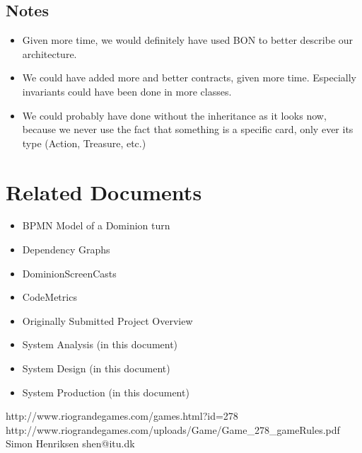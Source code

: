 \documentclass[12pt,a4paper,notitlepage]{article}
\begin{document}
\subsection{Notes}
\begin{itemize}
\item Given more time, we would definitely have used BON to better describe our architecture.
\item We could have added more and better contracts, given more time. Especially invariants could have been done in more classes.
\item We could probably have done without the inheritance as it looks now, because we never use the fact that something is a specific card, only ever its type (Action, Treasure, etc.)
\end{itemize}
\pagebreak

\pagebreak

\pagebreak

\section{Related Documents}
\begin{itemize}
\item BPMN Model of a Dominion turn
\item Dependency Graphs
\item DominionScreenCasts
\item CodeMetrics
\item Originally Submitted Project Overview
\item System Analysis (in this document)
\item System Design (in this document)
\item System Production (in this document)
\end{itemize}




\begin{thebibliography}{9}
 http://www.riograndegames.com/games.html?id=278
 http://www.riograndegames.com/uploads/Game/Game\_278\_gameRules.pdf
 Simon Henriksen shen{\makeatletter @\makeatother}itu.dk
\end{thebibliography}
\end{document}
